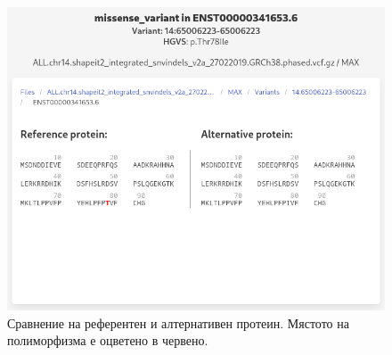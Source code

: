 \documentclass[pdftex,cyrillic,14pt,a4page,twoside,openright]{extreport}
\begin{document}
\begin{figure}[ht]
  \centering
  \includegraphics[width=16cm]{figures/protein_comparison}
  \caption {Сравнение на референтен и алтернативен протеин. Мястото на полиморфизма е оцветено в червено.}
  \label{fig:protein_comparison}
\end{figure}
\end{document}

